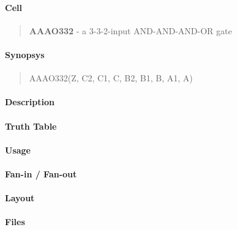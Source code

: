 \label{AAAO332}
\paragraph{Cell}
\begin{quote}
    \textbf{AAAO332} - a 3-3-2-input AND-AND-AND-OR gate
\end{quote}

\paragraph{Synopsys}
\begin{quote}
    AAAO332(Z, C2, C1, C, B2, B1, B, A1, A)
\end{quote}

\paragraph{Description}

%

\paragraph{Truth Table}
%

\paragraph{Usage}

\paragraph{Fan-in / Fan-out}

\paragraph{Layout}

\paragraph{Files}
